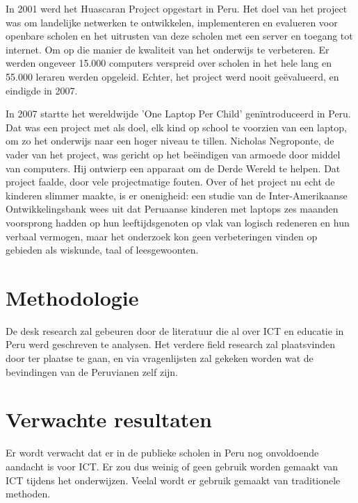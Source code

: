 In 2001 werd het Huascaran Project opgestart in Peru. Het doel van het project was om landelijke netwerken te ontwikkelen, implementeren en evalueren voor openbare scholen en het uitrusten van deze scholen met een server en toegang tot internet. Om op die manier de kwaliteit van het onderwijs te verbeteren. Er werden ongeveer 15.000 computers verspreid over scholen in het hele lang en 55.000 leraren werden opgeleid. Echter, het project werd nooit ge\"evalueerd, en eindigde in 2007.  \autocite{salas-pilco2014}

In 2007 startte het wereldwijde 'One Laptop Per Child' gen\"introduceerd in Peru. Dat was een project met als doel, elk kind op school te voorzien van een laptop, om zo het onderwijs naar een hoger niveau te tillen. Nicholas Negroponte, de vader van het project, was gericht op het beëindigen van armoede door middel van computers. Hij ontwierp een apparaat om de Derde Wereld te helpen. Dat project faalde, door vele projectmatige fouten. \autocite{Wooster2018} Over of het project nu echt de kinderen slimmer maakte, is er onenigheid: een studie \autocite{Severin2012} van de Inter-Amerikaanse Ontwikkelingsbank wees uit dat Peruaanse kinderen met laptops zes maanden voorsprong hadden op hun leeftijdsgenoten op vlak van logisch redeneren en hun verbaal vermogen, maar het onderzoek kon  geen verbeteringen vinden op gebieden als wiskunde, taal of leesgewoonten. \autocite{Murhpy2012}
 

\section{Methodologie}
\label{sec:methodologie}
De desk research zal gebeuren door de literatuur die al over ICT en educatie in Peru werd geschreven te analysen. Het verdere field research zal plaatsvinden door ter plaatse te gaan, en via vragenlijsten zal gekeken worden wat de bevindingen van de Peruvianen zelf zijn.
 

\section{Verwachte resultaten}
\label{sec:verwachte_resultaten}
Er wordt verwacht dat er in de publieke scholen in Peru nog  onvoldoende aandacht is voor ICT. Er zou dus weinig of geen gebruik worden gemaakt van ICT tijdens het onderwijzen. Veelal wordt er gebruik gemaakt van traditionele methoden.

